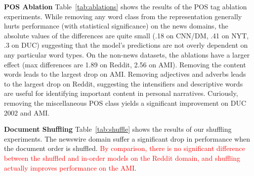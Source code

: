 

\textbf{POS Ablation} Table~\ref{tab:ablations} shows the results of the POS
tag ablation experiments. 
While removing any word class from the representation generally hurts 
performance (with statistical significance) on the news domains,
the absolute values of the differences are quite small 
(.18 on CNN/DM, .41 on NYT, .3 on DUC) suggesting that the model's predictions
are not overly dependent on any particular word types. 
On the non-news datasets, the ablations have a larger effect 
(max differences are 1.89 on Reddit, 2.56 on AMI). 
Removing the content words leads to the largest drop on AMI.
Removing adjectives and adverbs leads to the largest drop on Reddit,
suggesting the intensifiers and descriptive words are useful for 
identifying important content in personal narratives.
Curiously, 
removing the miscellaneous POS class yields a significant improvement
on DUC 2002 and AMI.




\textbf{Document Shuffling} Table~\ref{tab:shuffle} shows the results
of our shuffling experiments. 
The newswire domain suffer a significant drop in performance 
when the document order is shuffled. \textcolor{red}{By comparison, there is no significant difference between the shuffled and in-order models on 
the Reddit domain, and shuffling actually improves performance on the AMI}.







